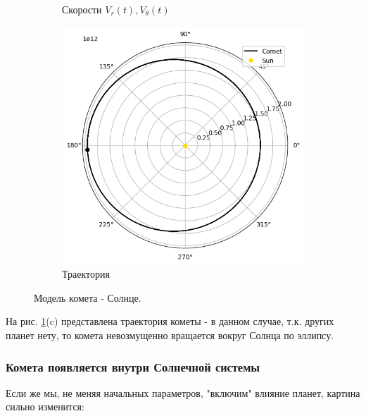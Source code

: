 \begin{figure}[H]
\begin{subfigure}{0.49\linewidth}
		\caption{Скорости $V_r(t), V_\theta(t)$}
	\end{subfigure}
	\begin{subfigure}{0.49\linewidth}
        \centering
		\includegraphics[width=1\linewidth]{imgs_8/trjSunComet.png}
		\caption{Траектория}
    \end{subfigure}
    \caption{Модель комета - Солнце.}
    \label{fig:SunComet}
\end{figure}
На рис. \ref{fig:SunComet}(c) представлена траектория кометы - в данном случае, т.к. других планет нету, то комета
невозмущенно вращается вокруг Солнца по эллипсу.
\subsubsection*{Комета появляется внутри Солнечной системы}
Если же мы, не меняя начальных параметров, "включим" влияние планет, картина сильно изменится:

